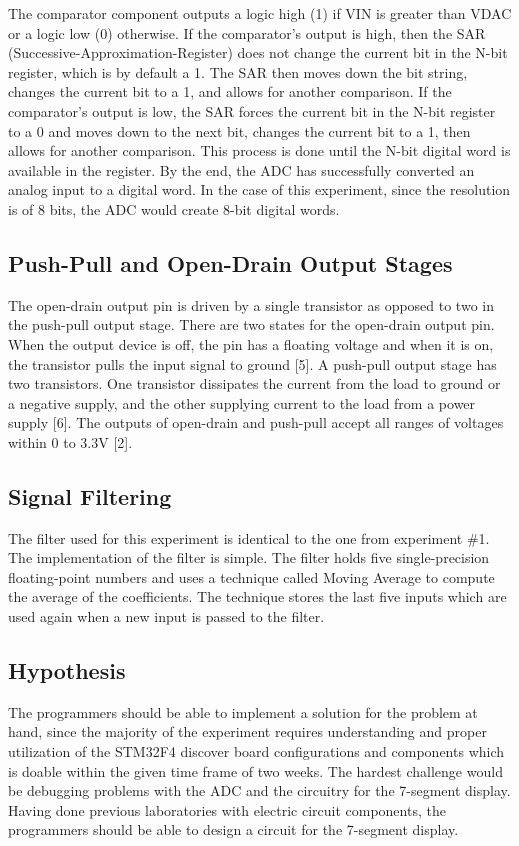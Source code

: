 \documentclass[12pt]{report}
\begin{document}
The comparator component outputs a logic high (1) if VIN is greater than VDAC or a logic low (0) otherwise. If the comparator's output is high, then the SAR (Successive-Approximation-Register) does not change the current bit in the N-bit register, which is by default a 1. The SAR then moves down the bit string, changes the current bit to a 1, and allows for another comparison. If the comparator's output is low, the SAR forces the current bit in the N-bit register to a 0 and moves down to the next bit, changes the current bit to a 1, then allows for another comparison. This process is done until the N-bit digital word is available in the register. By the end, the ADC has successfully converted an analog input to a digital word. In the case of this experiment, since the resolution is of 8 bits, the ADC would create 8-bit digital words.
\subsection{Push-Pull and Open-Drain Output Stages}
The open-drain output pin is driven by a single transistor as opposed to two in the push-pull output stage. There are two states for the open-drain output pin. When the output device is off, the pin has a floating voltage and when it is on, the transistor pulls the input signal to ground [5].
A push-pull output stage has two transistors. One transistor dissipates the current from the load to ground or a negative supply, and the other supplying current to the load from a power supply [6]. The outputs of open-drain and push-pull accept all ranges of voltages within 0 to 3.3V [2]. 
\subsection{Signal Filtering}
The filter used for this experiment is identical to the one from experiment \#1. The implementation of the filter is simple. The filter holds five single-precision floating-point numbers and uses a technique called Moving Average to compute the average of the coefficients. The technique stores the last five inputs which are used again when a new input is passed to the filter.
\subsection{Hypothesis}
The programmers should be able to implement a solution for the problem at hand, since the majority of the experiment requires understanding and proper utilization of the STM32F4 discover board configurations and components which is doable within the given time frame of two weeks. The hardest challenge would be debugging problems with the ADC and the circuitry for the 7-segment display. Having done previous laboratories with electric circuit components, the programmers should be able to design a circuit for the 7-segment display.
\end{document}
